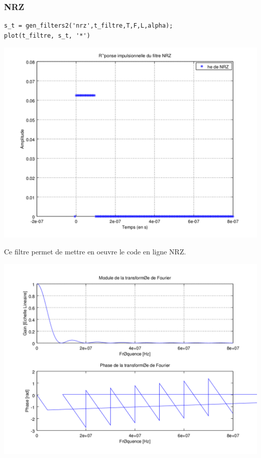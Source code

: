 \documentclass{acm_proc_article-sp}
\begin{document}
\subsubsection{NRZ}

\begin{center}
\begin{lstlisting}
s_t = gen_filters2('nrz',t_filtre,T,F,L,alpha);
plot(t_filtre, s_t, '*')
\end{lstlisting}

\includegraphics[scale=0.45]{NRZ_3.png}


Ce filtre permet de mettre en oeuvre le code en ligne NRZ.

\begin{center}
\includegraphics[scale=0.45]{NRZ_rep_3.png}
\end{center}


\end{center}
\end{document}
